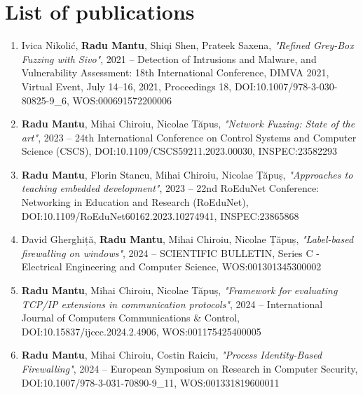 
\section{List of publications}
\label{conclusion:publications}
{

\begin{enumerate}
    \item Ivica Nikolić, \textbf{Radu Mantu}, Shiqi Shen, Prateek Saxena,
          \textit{"Refined Grey-Box Fuzzing with Sivo"},
          2021 -- Detection of Intrusions and Malware, and Vulnerability
          Assessment: 18th International Conference, DIMVA 2021, Virtual
          Event, July 14–16, 2021, Proceedings 18,
          DOI:10.1007/978-3-030-80825-9\_6, WOS:000691572200006

    \item \textbf{Radu Mantu}, Mihai Chiroiu, Nicolae Tăpus,
          \textit{"Network Fuzzing: State of the art"},
          2023 -- 24th International Conference on Control Systems and Computer
          Science (CSCS),
          DOI:10.1109/CSCS59211.2023.00030, INSPEC:23582293

    \item \textbf{Radu Mantu}, Florin Stancu, Mihai Chiroiu, Nicolae Țăpuș,
          \textit{"Approaches to teaching embedded development"},
          2023 -- 22nd RoEduNet Conference: Networking in Education and Research
          (RoEduNet),
          DOI:10.1109/RoEduNet60162.2023.10274941, INSPEC:23865868

    \item David Gherghiță, \textbf{Radu Mantu}, Mihai Chiroiu, Nicolae Țăpuș,
          \textit{"Label-based firewalling on windows"},
          2024 -- SCIENTIFIC BULLETIN, Series C - Electrical Engineering and
          Computer Science,
          WOS:001301345300002

    \item \textbf{Radu Mantu}, Mihai Chiroiu, Nicolae Tăpuș,
          \textit{"Framework for evaluating TCP/IP extensions in communication
          protocols"},
          2024 -- International Journal of Computers Communications \& Control,
          DOI:10.15837/ijccc.2024.2.4906, WOS:001175425400005

    \item \textbf{Radu Mantu}, Mihai Chiroiu, Costin Raiciu,
          \textit{"Process Identity-Based Firewalling"},
          2024 -- European Symposium on Research in Computer Security,
          DOI:10.1007/978-3-031-70890-9\_11, WOS:001331819600011


\end{enumerate}}
